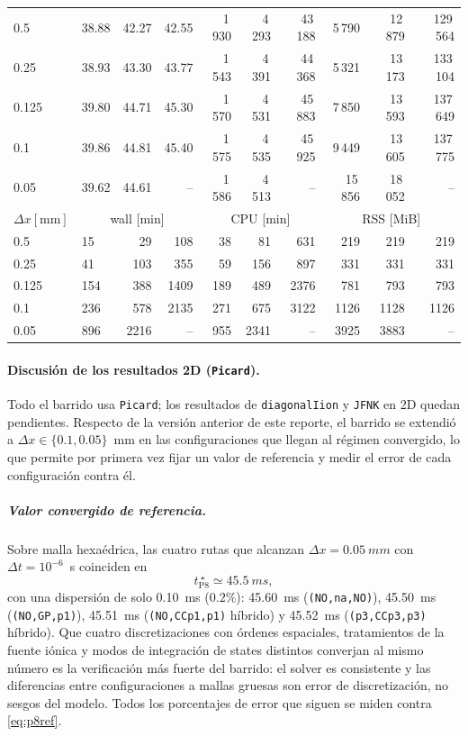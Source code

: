 \documentclass[11pt,a4paper]{article}
\newcommand{\code}[1]{\texttt{\small #1}}
\begin{document}
\begin{center}
\begin{longtable}{l|lrr|rrr|rrr}
0.5 & 38.88 & 42.27 & 42.55 & 1\,930 & 4\,293 & 43\,188 & 5\,790 & 12\,879 & 129\,564\\
0.25 & 38.93 & 43.30 & 43.77 & 1\,543 & 4\,391 & 44\,368 & 5\,321 & 13\,173 & 133\,104\\
0.125 & 39.80 & 44.71 & 45.30 & 1\,570 & 4\,531 & 45\,883 & 7\,850 & 13\,593 & 137\,649\\
0.1 & 39.86 & 44.81 & 45.40 & 1\,575 & 4\,535 & 45\,925 & 9\,449 & 13\,605 & 137\,775\\
0.05 & 39.62 & 44.61 & -- & 1\,586 & 4\,513 & -- & 15\,856 & 18\,052 & --\\
\hline
$ \Delta x [\text{mm}] $ & \multicolumn{3}{c|}{wall [min]} & \multicolumn{3}{c|}{CPU [min]} & \multicolumn{3}{c|}{RSS [MiB]}\\
0.5 & 15 & 29 & 108 & 38 & 81 & 631 & 219 & 219 & 219\\
0.25 & 41 & 103 & 355 & 59 & 156 & 897 & 331 & 331 & 331\\
0.125 & 154 & 388 & 1409 & 189 & 489 & 2376 & 781 & 793 & 793\\
0.1 & 236 & 578 & 2135 & 271 & 675 & 3122 & 1126 & 1128 & 1126\\
0.05 & 896 & 2216 & -- & 955 & 2341 & -- & 3925 & 3883 & --\\
\hline
\bottomrule\end{longtable}\end{center}

\paragraph{Discusión de los resultados 2D (\code{Picard}).}
Todo el barrido usa \code{Picard}; los resultados de \code{diagonalIion} y \code{JFNK}
en 2D quedan pendientes. Respecto de la versión anterior de este reporte, el barrido se
extendió a $\Delta x\in\{0.1,0.05\}$~mm en las configuraciones que llegan al régimen
convergido, lo que permite por primera vez fijar un valor de referencia y medir el error
de cada configuración contra él.

\subparagraph{Valor convergido de referencia.}
Sobre malla hexaédrica, las cuatro rutas que alcanzan $\Delta x=\SI{0.05}{mm}$ con
$\Delta t=10^{-6}$~s coinciden en
\begin{equation}
  t_{\mathrm{P8}}^{\ \star} \simeq \SI{45.5}{ms},
  \label{eq:p8ref}
\end{equation}
con una dispersión de solo \SI{0.10}{ms} ($0.2\%$): \SI{45.60}{ms}
(\code{(NO,na,NO)}), \SI{45.50}{ms} (\code{(NO,GP,p1)}), \SI{45.51}{ms}
(\code{(NO,CCp1,p1)} híbrido) y \SI{45.52}{ms} (\code{(p3,CCp3,p3)} híbrido). Que
cuatro discretizaciones con órdenes espaciales, tratamientos de la fuente iónica y
modos de integración de states distintos converjan al mismo número es la verificación
más fuerte del barrido: el solver es consistente y las diferencias entre
configuraciones a mallas gruesas son error de discretización, no sesgos del modelo.
Todos los porcentajes de error que siguen se miden contra \eqref{eq:p8ref}.
\end{document}
